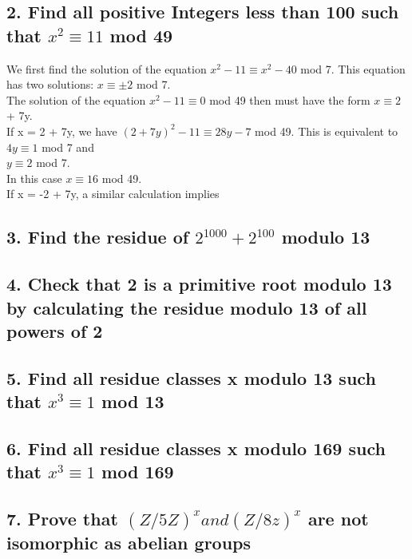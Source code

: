 \documentclass{article}
\begin{document}
\begin{spacing}{1.1}
\vfill

\subsection{2.  Find all positive Integers less than 100 such that $x^2 \equiv 11$ mod 49}

We first find the solution of the equation $x^2 - 11 \equiv x^2 - 40$ mod 7.  This equation has two solutions: $x \equiv \pm 2$ mod 7.  
\\The solution of the equation $x^2 - 11 \equiv 0$ mod 49 then must have the form $x \equiv 2$ + 7y.  
\\If x = 2 + 7y, we have $(2 + 7y)^2 - 11 \equiv 28y - 7$ mod 49.  This is equivalent to
\\$4y \equiv 1$ mod 7 and 
\\$y \equiv 2$ mod 7.  
\\In this case $x \equiv 16$ mod 49.  
\\If x = -2 + 7y, a similar calculation implies 

\vfill

\subsection{3.  Find the residue of $2^{1000} + 2^{100}$ modulo 13}

\vfill

\subsection{4.  Check that 2 is a primitive root modulo 13 by calculating the residue modulo 13 of all powers of 2}

\vfill

\subsection{5.  Find all residue classes x modulo 13 such that $x^3 \equiv 1$ mod 13}

\vfill

\subsection{6.  Find all residue classes x modulo 169 such that $x^3 \equiv 1$ mod 169}

\vfill

\subsection{7.  Prove that $(Z/5Z)^x and (Z/8z)^x$ are not isomorphic as abelian groups}


\end{spacing}
\end{document}
